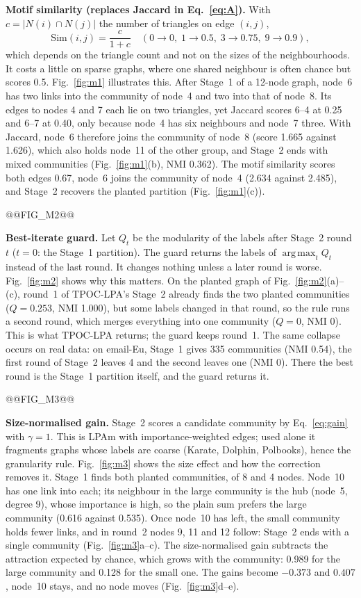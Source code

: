 \documentclass[conference]{IEEEtran}
\DeclareMathOperator*{\argmax}{arg\,max}
\begin{document}
\textbf{Motif similarity (replaces Jaccard in Eq.~\eqref{eq:A}).} With $c=|N(i)\cap N(j)|$ the number of triangles on edge $(i,j)$,
\begin{equation}
\mathrm{Sim}(i,j)=\frac{c}{1+c}\quad(0\to0,\;1\to0.5,\;3\to0.75,\;9\to0.9),\label{eq:motif}
\end{equation}
which depends on the triangle count and not on the sizes of the neighbourhoods. It costs a little on sparse graphs, where one shared neighbour is often chance but scores 0.5. Fig.~\ref{fig:m1} illustrates this. After Stage~1 of a 12-node graph, node~6 has two links into the community of node~4 and two into that of node~8. Its edges to nodes 4 and 7 each lie on two triangles, yet Jaccard scores 6--4 at 0.25 and 6--7 at 0.40, only because node~4 has six neighbours and node~7 three. With Jaccard, node~6 therefore joins the community of node~8 (score 1.665 against 1.626), which also holds node~11 of the other group, and Stage~2 ends with mixed communities (Fig.~\ref{fig:m1}(b), NMI 0.362). The motif similarity scores both edges 0.67, node~6 joins the community of node~4 (2.634 against 2.485), and Stage~2 recovers the planted partition (Fig.~\ref{fig:m1}(c)).


@@FIG_M2@@

\textbf{Best-iterate guard.} Let $Q_t$ be the modularity of the labels after Stage~2 round $t$ ($t=0$: the Stage~1 partition). The guard returns the labels of $\argmax_tQ_t$ instead of the last round. It changes nothing unless a later round is worse. Fig.~\ref{fig:m2} shows why this matters. On the planted graph of Fig.~\ref{fig:m2}(a)--(c), round~1 of TPOC-LPA's Stage~2 already finds the two planted communities ($Q=0.253$, NMI 1.000), but some labels changed in that round, so the rule runs a second round, which merges everything into one community ($Q=0$, NMI 0). This is what TPOC-LPA returns; the guard keeps round~1. The same collapse occurs on real data: on email-Eu, Stage~1 gives 335 communities (NMI 0.54), the first round of Stage~2 leaves 4 and the second leaves one (NMI 0). There the best round is the Stage~1 partition itself, and the guard returns it.

@@FIG_M3@@

\textbf{Size-normalised gain.} Stage~2 scores a candidate community by Eq.~\eqref{eq:gain} with $\gamma=1$. This is LPAm with importance-weighted edges; used alone it fragments graphs whose labels are coarse (Karate, Dolphin, Polbooks), hence the granularity rule. Fig.~\ref{fig:m3} shows the size effect and how the correction removes it. Stage~1 finds both planted communities, of 8 and 4 nodes. Node~10 has one link into each; its neighbour in the large community is the hub (node~5, degree 9), whose importance is high, so the plain sum prefers the large community (0.616 against 0.535). Once node~10 has left, the small community holds fewer links, and in round~2 nodes 9, 11 and 12 follow: Stage~2 ends with a single community (Fig.~\ref{fig:m3}a--c). The size-normalised gain subtracts the attraction expected by chance, which grows with the community: 0.989 for the large community and 0.128 for the small one. The gains become $-0.373$ and $0.407$, node~10 stays, and no node moves (Fig.~\ref{fig:m3}d--e).
\end{document}
